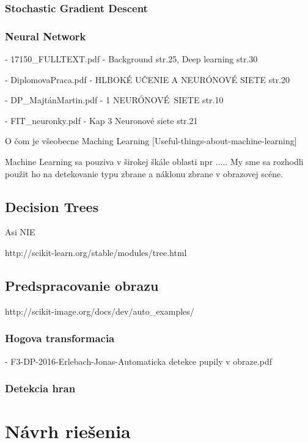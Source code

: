 \documentclass[10pt,a4paper]{article}
\begin{document}
\subsubsection{Stochastic Gradient Descent}

\subsubsection{Neural Network}
- 17150\_FULLTEXT.pdf - Background str.25, Deep learning str.30

- DiplomovaPraca.pdf - HLBOKÉ UČENIE A NEURÓNOVÉ SIETE str.20

- DP\_MajtánMartin.pdf - 1 NEURÓNOVÉ\ SIETE str.10

- FIT\_neuronky.pdf - Kap 3 Neuronové siete str.21

O čom je všeobecne Maching Learning
[Useful-things-about-machine-learning]

Machine Learning sa pouziva v širokej škále oblasti npr .....
My sme sa rozhodli použit ho na detekovanie typu zbrane a náklonu zbrane v obrazovej scéne.



\subsection{Decision Trees}
Asi NIE

http://scikit-learn.org/stable/modules/tree.html



\subsection{Predspracovanie obrazu}
http://scikit-image.org/docs/dev/auto\_examples/

\subsubsection{Hogova transformacia}
- F3-DP-2016-Erlebach-Jonas-Automaticka detekce pupily v obraze.pdf

\subsubsection{Detekcia hran}



\section{Návrh riešenia}
\end{document}
